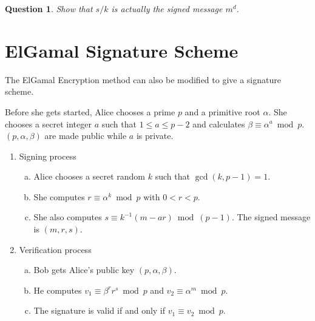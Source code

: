 \documentclass[12pt]{amsart}
\theoremstyle{plain}
\newtheorem{quest}{Question}
\theoremstyle{definition}
\theoremstyle{remark}
\begin{document}
\begin{quest}
Show that $s/k$ is actually the signed message $m^d$.\\ \vspace{2in}
\end{quest}

\section{ElGamal Signature Scheme}
The ElGamal Encryption method can also be modified to give a signature scheme.

\begin{framed}
Before she gets started, Alice chooses a prime $p$ and a primitive root $\alpha$.  She chooses a secret integer $a$ such that $1 \leq a \leq p-2$ and calculates $\beta \equiv \alpha^a \bmod p$.  $(p, \alpha, \beta)$ are made public while $a$ is private.
\begin{enumerate}[1.]
	\item Signing process
		\begin{enumerate}[a.]
			\item Alice chooses a secret random $k$ such that $\gcd(k,p-1) = 1$.
			\item She computes $r \equiv \alpha^k \bmod p \text{ with } 0 < r < p$.
			\item She also computes $s \equiv k^{-1}(m-ar) \bmod (p-1).$  The signed message is $(m,r,s)$.
		\end{enumerate}
	\item Verification process
	\begin{enumerate}[a.]
		\item Bob gets Alice's public key $(p, \alpha, \beta)$.
		\item He computes $v_1 \equiv \beta^r r^s \bmod p$ and $v_2 \equiv \alpha^m \bmod p$.
		\item The signature is valid if and only if $v_1 \equiv v_2 \bmod p$.
	\end{enumerate}
\end{enumerate}
\end{framed}
\end{document}
